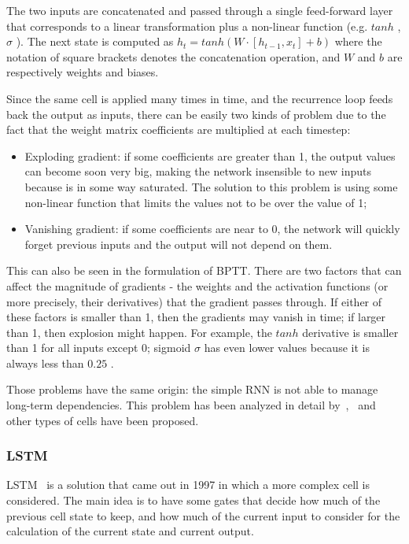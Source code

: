 The two inputs are concatenated and passed through a single feed-forward layer that corresponds to a linear transformation plus a non-linear function (e.g.  \( tanh \) ,  \(  \sigma  \) ). The next state is computed as  \( h_{t}=tanh \left( W\cdot  \left[ h_{t-1}, x_{t} \right]  + b \right)  \)  where the notation of square brackets denotes the concatenation operation, and  \( W \)  and  \( b \)  are respectively weights and biases.

Since the same cell is applied many times in time, and the recurrence loop feeds back the output as inputs, there can be easily two kinds of problem due to the fact that the weight matrix coefficients are multiplied at each timestep:

\begin{itemize}
	\item Exploding gradient: if some coefficients are greater than 1, the output values can become soon very big, making the network insensible to new inputs because is in some way saturated. The solution to this problem is using some non-linear function that limits the values not to be over the value of 1;

	\item Vanishing gradient: if some coefficients are near to 0, the network will quickly forget previous inputs and the output will not depend on them.
\end{itemize}

This can also be seen in the formulation of BPTT. There are two factors that can affect the magnitude of gradients - the weights and the activation functions (or more precisely, their derivatives) that the gradient passes through. If either of these factors is smaller than 1, then the gradients may vanish in time; if larger than 1, then explosion might happen. For example, the  \( tanh \)  derivative is smaller than 1 for all inputs except 0; sigmoid  \(  \sigma  \)  has even lower values because it is always less than  \( 0.25 \) .

Those problems have the same origin: the simple RNN is not able to manage long-term dependencies. This problem has been analyzed in detail by~\cite{bengio1994learning},~\cite{hochreiter1998vanishing} and other types of cells have been proposed.

\subsubsection{LSTM}
LSTM~\cite{hochreiter1997long} is a solution that came out in 1997 in which a more complex cell is considered. The main idea is to have some gates that decide how much of the previous cell state to keep, and how much of the current input to consider for the calculation of the current state and current output.

